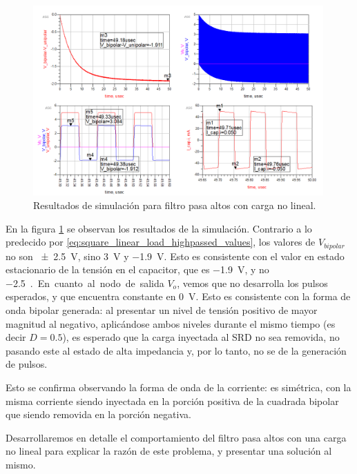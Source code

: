 \begin{figure}[tbp]
    \centering
    \includegraphics[width=0.99\textwidth]{images/highpass_filter_nonlinear_load_sim_result.png}
    \caption{Resultados de simulación para filtro pasa altos con carga no lineal.}
    \label{fig:highpass_filter_nonlinear_load_sim_result}
\end{figure}

En la figura \ref{fig:highpass_filter_nonlinear_load_sim_result} se observan los
resultados de la simulación. Contrario a lo predecido por
\ref{eq:square_linear_load_highpassed_values}, los valores de $V_{bipolar}$ no
son \qty{\pm2.5}{\volt}, sino \qty{3}{\volt} y \qty{-1.9}{\volt}. Esto es
consistente con el valor en estado estacionario de la tensión en el capacitor,
que es \qty{-1.9}{\volt}, y no \qty{-2.5}{\volt.}

En cuanto al nodo de salida $V_o$, vemos que no desarrolla los pulsos esperados,
y que encuentra constante en \qty{0}{\volt}. Esto es consistente con la forma de
onda bipolar generada: al presentar un nivel de tensión positivo de mayor
magnitud al negativo, aplicándose ambos niveles durante el mismo tiempo (es
decir $D=0.5$), es esperado que la carga inyectada al SRD no sea removida, no
pasando este al estado de alta impedancia y, por lo tanto, no se de la
generación de pulsos.

Esto se confirma observando la forma de onda de la corriente: es simétrica, con
la misma corriente siendo inyectada en la porción positiva de la cuadrada
bipolar que siendo removida en la porción negativa.

Desarrollaremos en detalle el comportamiento del filtro pasa altos con una carga
no lineal para explicar la razón de este problema, y presentar una solución al
mismo.

